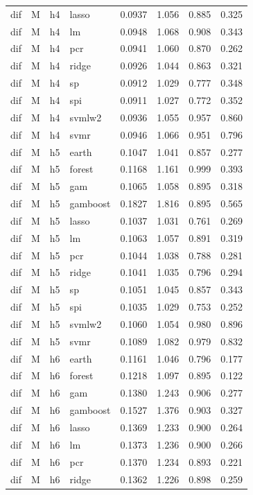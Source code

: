 \begin{ThreePartTable}
\begin{longtable}[t]{llclcccc}
dif & M & h4 & lasso & 0.0937 & 1.056 & 0.885 & 0.325\\
dif & M & h4 & lm & 0.0948 & 1.068 & 0.908 & 0.343\\
dif & M & h4 & pcr & 0.0941 & 1.060 & 0.870 & 0.262\\
dif & M & h4 & ridge & 0.0926 & 1.044 & 0.863 & 0.321\\
dif & M & h4 & sp & 0.0912 & 1.029 & 0.777 & 0.348\\
dif & M & h4 & spi & 0.0911 & 1.027 & 0.772 & 0.352\\
dif & M & h4 & svmlw2 & 0.0936 & 1.055 & 0.957 & 0.860\\
dif & M & h4 & svmr & 0.0946 & 1.066 & 0.951 & 0.796\\
\addlinespace
dif & M & h5 & earth & 0.1047 & 1.041 & 0.857 & 0.277\\
dif & M & h5 & forest & 0.1168 & 1.161 & 0.999 & 0.393\\
dif & M & h5 & gam & 0.1065 & 1.058 & 0.895 & 0.318\\
dif & M & h5 & gamboost & 0.1827 & 1.816 & 0.895 & 0.565\\
dif & M & h5 & lasso & 0.1037 & 1.031 & 0.761 & 0.269\\
dif & M & h5 & lm & 0.1063 & 1.057 & 0.891 & 0.319\\
dif & M & h5 & pcr & 0.1044 & 1.038 & 0.788 & 0.281\\
dif & M & h5 & ridge & 0.1041 & 1.035 & 0.796 & 0.294\\
dif & M & h5 & sp & 0.1051 & 1.045 & 0.857 & 0.343\\
dif & M & h5 & spi & 0.1035 & 1.029 & 0.753 & 0.252\\
dif & M & h5 & svmlw2 & 0.1060 & 1.054 & 0.980 & 0.896\\
dif & M & h5 & svmr & 0.1089 & 1.082 & 0.979 & 0.832\\
\addlinespace
dif & M & h6 & earth & 0.1161 & 1.046 & 0.796 & 0.177\\
dif & M & h6 & forest & 0.1218 & 1.097 & 0.895 & 0.122\\
dif & M & h6 & gam & 0.1380 & 1.243 & 0.906 & 0.277\\
dif & M & h6 & gamboost & 0.1527 & 1.376 & 0.903 & 0.327\\
dif & M & h6 & lasso & 0.1369 & 1.233 & 0.900 & 0.264\\
dif & M & h6 & lm & 0.1373 & 1.236 & 0.900 & 0.266\\
dif & M & h6 & pcr & 0.1370 & 1.234 & 0.893 & 0.221\\
dif & M & h6 & ridge & 0.1362 & 1.226 & 0.898 & 0.259\\

\end{longtable}
\end{ThreePartTable}
